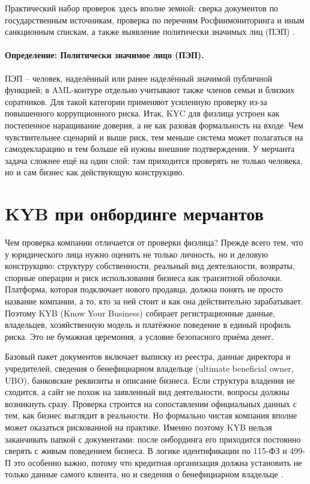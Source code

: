 Практический набор проверок здесь вполне земной: сверка документов
по государственным источникам, проверка по перечням
Росфинмониторинга и иным санкционным спискам, а также выявление
политически значимых лиц (ПЭП) \cite{cbr-499p}\cite{fatf-pep-guidance}.

\paragraph{Определение: Политически значимое лицо (ПЭП).}
ПЭП -- человек, наделённый или ранее наделённый значимой публичной функцией; в AML-контуре отдельно учитывают также членов семьи и близких соратников. Для такой категории применяют усиленную проверку из-за повышенного коррупционного риска.
Итак, KYC для физлица устроен как постепенное наращивание доверия,
а не как разовая формальность на входе. Чем чувствительнее сценарий
и выше риск, тем меньше система может полагаться на самодекларацию
и тем больше ей нужны внешние подтверждения. У мерчанта задача
сложнее ещё на один слой: там приходится проверять не только
человека, но и сам бизнес как действующую конструкцию.

\section{KYB при онбординге мерчантов}
\label{sec:compliance-kyb}

Чем проверка компании отличается от проверки физлица? Прежде всего
тем, что у юридического лица нужно оценить не только личность, но и
деловую конструкцию: структуру собственности, реальный вид
деятельности, возвраты, спорные операции и риск использования
бизнеса как транзитной оболочки. Платформа, которая подключает
нового продавца, должна понять не просто название компании, а то,
кто за ней стоит и как она действительно зарабатывает. Поэтому KYB
(Know Your Business) собирает регистрационные данные, владельцев,
хозяйственную модель и платёжное поведение в единый профиль риска.
Это не бумажная церемония, а условие безопасного приёма денег.

Базовый пакет документов включает выписку из реестра, данные
директора и учредителей, сведения о бенефициарном владельце
(ultimate beneficial owner, UBO), банковские реквизиты и описание
бизнеса. Если структура владения не сходится, а сайт не похож на
заявленный вид деятельности, вопросы должны возникнуть сразу.
Проверка строится на сопоставлении официальных данных с тем, как
бизнес выглядит в реальности. Но формально чистая компания вполне
может оказаться рискованной на практике. Именно поэтому KYB нельзя
заканчивать папкой с документами: после онбординга его приходится
постоянно сверять с живым поведением бизнеса. В логике
идентификации по 115-ФЗ и \mbox{499-П} это особенно важно,
потому что кредитная организация должна установить не только данные
самого клиента, но и сведения о бенефициарном владельце
\cite{cbr-499p}.

